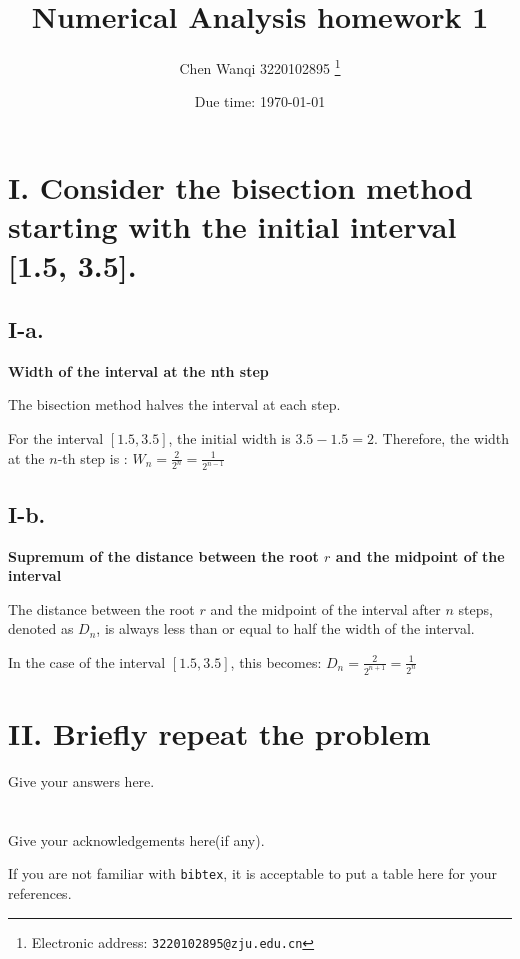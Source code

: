 \documentclass[a4paper]{article}
\begin{document}
\title{Numerical Analysis homework  1}

\author{Chen Wanqi 3220102895
  \thanks{Electronic address: \texttt{3220102895@zju.edu.cn}}}


\date{Due time: \today}

\maketitle





\section*{I.  Consider the bisection method starting with the initial interval [1.5, 3.5]. }

\subsection*{I-a. }
\textbf{Width of the interval at the nth step}

The bisection method halves the interval at each step.

For the interval $[1.5, 3.5]$, the initial width is $ 3.5 - 1.5 = 2 $. Therefore, the width at the $n$-th step is :  $W_n = \frac{2}{2^n} = \frac{1}{2^{n-1}}$
   

\subsection*{I-b.}
\textbf{Supremum of the distance between the root $r$ and the midpoint of the interval}

The distance between the root $r$ and the midpoint of the interval after $n$ steps, denoted as 
$D_n$, is always less than or equal to half the width of the interval. 

In the case of the interval $[1.5, 3.5]$, this becomes:  $D_n = \frac{2}{2^{n+1}} = \frac{1}{2^n}$
   
\section*{II. Briefly repeat the problem}

Give your answers here.





\section*{  }
Give your acknowledgements here(if any).


\printbibliography

If you are not familiar with \texttt{bibtex}, 
it is acceptable to put a table here for your references.
\end{document}
